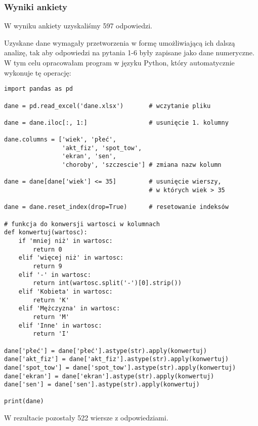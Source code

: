\documentclass[12pt,a4paper]{article}
\begin{document}
\newpage
\subsubsection{Wyniki ankiety}
W wyniku ankiety uzyskaliśmy 597 odpowiedzi.

\vspace{2mm}
Uzyskane dane wymagały przetworzenia w formę umożliwiającą ich dalszą analizę, tak aby odpowiedzi na pytania 1-6 były zapisane jako dane numeryczne. W tym celu opracowałam program w języku Python, który automatycznie wykonuje tę operację:

\vspace{3mm}
\begin{lstlisting}
import pandas as pd

dane = pd.read_excel('dane.xlsx')       # wczytanie pliku

dane = dane.iloc[:, 1:]                 # usunięcie 1. kolumny

dane.columns = ['wiek', 'płeć', 
                'akt_fiz', 'spot_tow',
                'ekran', 'sen', 
                'choroby', 'szczescie'] # zmiana nazw kolumn

dane = dane[dane['wiek'] <= 35]         # usunięcie wierszy, 
                                        # w których wiek > 35

dane = dane.reset_index(drop=True)      # resetowanie indeksów

# funkcja do konwersji wartosci w kolumnach
def konwertuj(wartosc):
    if 'mniej niż' in wartosc:
        return 0
    elif 'więcej niż' in wartosc:
        return 9
    elif '-' in wartosc:
        return int(wartosc.split('-')[0].strip())
    elif 'Kobieta' in wartosc:
        return 'K'
    elif 'Mężczyzna' in wartosc:
        return 'M'
    elif 'Inne' in wartosc:
        return 'I'

dane['płeć'] = dane['płeć'].astype(str).apply(konwertuj)
dane['akt_fiz'] = dane['akt_fiz'].astype(str).apply(konwertuj)
dane['spot_tow'] = dane['spot_tow'].astype(str).apply(konwertuj)
dane['ekran'] = dane['ekran'].astype(str).apply(konwertuj)
dane['sen'] = dane['sen'].astype(str).apply(konwertuj)

print(dane)
\end{lstlisting}

\newpage W rezultacie pozostały 522 wiersze z odpowiedziami.
\end{document}
